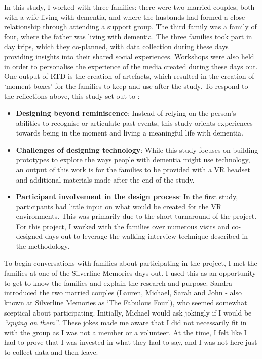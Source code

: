 In this study, I worked with three families: there were two married couples, both with a wife living with dementia, and where the husbands had formed a close relationship through attending a support group. The third family was a family of four, where the father was living with dementia. The three families took part in day trips, which they co-planned, with data collection during these days providing insights into their shared social experiences. Workshops were also held  in order to personalise the experience of the media created during these days out. One output of RTD is the creation of artefacts, which resulted in the creation of `moment boxes' for the families to keep and use after the study. To respond to the reflections above, this study set out to :

\begin{itemize}
    \item \textbf{Designing beyond reminiscence}: Instead of relying on the person's abilities to recognise or articulate past events, this study orients experiences towards being in the moment and living a meaningful life with dementia.

    \item \textbf{Challenges of designing technology}: While this study focuses on building prototypes to explore the ways people with dementia might use technology, an output of this work is for the families to be provided with a VR headset and additional materials made after the end of the study. 

    \item \textbf{Participant involvement in the design process}: In the first study, participants had little input on what would be created for the VR environments. This was primarily due to the short turnaround of the project. For this project, I worked with the families over numerous visits and co-designed days out to leverage the walking interview technique described in the methodology.
\end{itemize}

To begin conversations with families about participating in the project, I met the families at one of the Silverline Memories days out. I used this as an opportunity to get to know the families and explain the research and purpose. Sandra introduced the two married couples (Lauren, Michael, Sarah and John - also known at Silverline Memories as `The Fabulous Four'), who seemed somewhat sceptical about participating. Initially, Michael would ask jokingly if I would be \textit{``spying on them''}. These jokes made me aware that I did not necessarily fit in with the group as I was not a member or a volunteer. At the time, I felt like I had to prove that I was invested in what they had to say, and I was not here just to collect data and then leave. 

